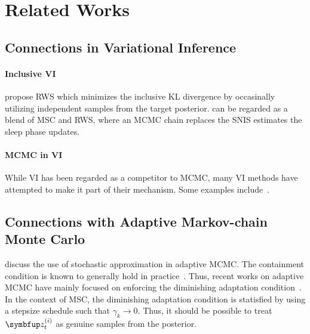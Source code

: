 
\section{Related Works}
\subsection{Connections in Variational Inference}
\paragraph{Inclusive VI}
\citet{DBLP:journals/corr/BornscheinB14} propose RWS which minimizes the inclusive KL divergence by occasinally utilizing independent samples from the target posterior.
\citep{kim2021adaptive} can be regarded as a blend of MSC and RWS, where an MCMC chain replaces the SNIS estimates the sleep phase updates.

\paragraph{MCMC in VI}
While VI has been regarded as a competitor to MCMC, many VI methods have attempted to make it part of their mechanism.
Some examples include~\citep{pmlr-v97-ruiz19a}.

\subsection{Connections with Adaptive Markov-chain Monte Carlo}
\citet{10.1007/s11222-008-9110-y, garthwaite_adaptive_2016} discuss the use of stochastic approximation in adaptive MCMC.
The containment condition is known to generally hold in practice~\citep{rosenthal_optimal_, bai_containment_2011}.
Thus, recent works on adaptive MCMC have mainly focused on enforcing the diminishing adaptation condition~\citep{wang_adaptive_2013}.
In the context of MSC, the diminishing adaptation condition is statisfied by using a stepsize schedule such that \(\gamma_k \rightarrow 0\).
Thus, it should be possible to treat \(\vz^{(i)}_t\) as genuine samples from the posterior.


